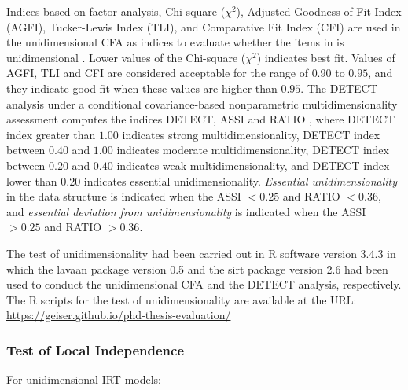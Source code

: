 Indices based on factor analysis, Chi-square (${\chi}^2$), Adjusted Goodness of Fit Index (AGFI), Tucker-Lewis Index (TLI), and Comparative Fit Index (CFI) are used in the unidimensional CFA as indices to evaluate whether the items in  is unidimensional \cite{Brown2014}. Lower values of the Chi-square (${\chi}^2$) indicates best fit. Values of AGFI, TLI and CFI are considered acceptable for the range of $0.90$ to $0.95$, and they indicate good fit when these values are higher than $0.95$. The DETECT analysis under a conditional covariance-based nonparametric multidimensionality assessment computes the indices DETECT, ASSI and RATIO \cite{Zhang2007}, where DETECT index greater than $1.00$ indicates strong multidimensionality, DETECT index between $0.40$ and $1.00$ indicates moderate multidimensionality, DETECT index between $0.20$ and $0.40$ indicates weak multidimensionality, and DETECT index lower than $0.20$ indicates essential unidimensionality. \emph{Essential unidimensionality} in the data structure is indicated when the ASSI $< 0.25$ and RATIO $< 0.36$, and \emph{essential deviation from unidimensionality} is indicated when the ASSI $> 0.25$ and RATIO $> 0.36$.

The test of unidimensionality had been carried out in R software version 3.4.3 \cite{RCoreTeam2017} in which the lavaan package version 0.5 \cite{Rosseel2012} and the sirt package version 2.6 \cite{Robitzsch2018} had been used to conduct the unidimensional CFA and the DETECT analysis, respectively. The R scripts for the test of unidimensionality are available at the URL: \url{https://geiser.github.io/phd-thesis-evaluation/}

\subsubsection*{Test of Local Independence}

For unidimensional IRT models:

\begin{citacao}
 \cite{HambletonSwaminathanRogers1991}
\end{citacao}

